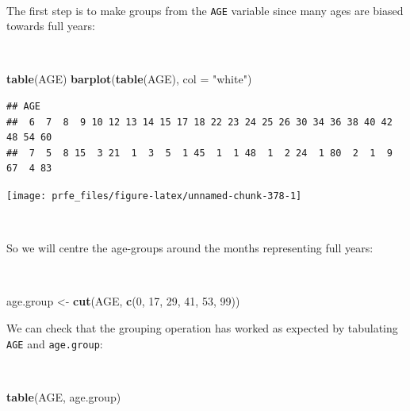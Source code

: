 \documentclass[12pt,a4paper]{book}
\newenvironment{Shaded}{\begin{snugshade}}{\end{snugshade}}
\newcommand{\KeywordTok}[1]{\textcolor[rgb]{0.13,0.29,0.53}{\textbf{#1}}}
\newcommand{\DataTypeTok}[1]{\textcolor[rgb]{0.13,0.29,0.53}{#1}}
\newcommand{\DecValTok}[1]{\textcolor[rgb]{0.00,0.00,0.81}{#1}}
\newcommand{\StringTok}[1]{\textcolor[rgb]{0.31,0.60,0.02}{#1}}
\newcommand{\NormalTok}[1]{#1}
\theoremstyle{definition}
\theoremstyle{definition}
\theoremstyle{definition}
\theoremstyle{remark}
\begin{document}
~

The first step is to make groups from the \texttt{AGE} variable since
many ages are biased towards full years:

~

\begin{Shaded}
\begin{Highlighting}[]
\KeywordTok{table}\NormalTok{(AGE)}
\KeywordTok{barplot}\NormalTok{(}\KeywordTok{table}\NormalTok{(AGE), }\DataTypeTok{col =} \StringTok{"white"}\NormalTok{)}
\end{Highlighting}
\end{Shaded}

\begin{verbatim}
## AGE
##  6  7  8  9 10 12 13 14 15 17 18 22 23 24 25 26 30 34 36 38 40 42 48 54 60 
##  7  5  8 15  3 21  1  3  5  1 45  1  1 48  1  2 24  1 80  2  1  9 67  4 83
\end{verbatim}

\begin{center}\texttt{[image: prfe\_files/figure-latex/unnamed-chunk-378-1]} \end{center}

~

So we will centre the age-groups around the months representing full
years:

~

\begin{Shaded}
\begin{Highlighting}[]
\NormalTok{age.group <-}\StringTok{ }\KeywordTok{cut}\NormalTok{(AGE, }\KeywordTok{c}\NormalTok{(}\DecValTok{0}\NormalTok{, }\DecValTok{17}\NormalTok{, }\DecValTok{29}\NormalTok{, }\DecValTok{41}\NormalTok{, }\DecValTok{53}\NormalTok{, }\DecValTok{99}\NormalTok{))}
\end{Highlighting}
\end{Shaded}

\newpage

We can check that the grouping operation has worked as expected by
tabulating \texttt{AGE} and \texttt{age.group}:

~

\begin{Shaded}
\begin{Highlighting}[]
\KeywordTok{table}\NormalTok{(AGE, age.group)}
\end{Highlighting}
\end{Shaded}
\end{document}
